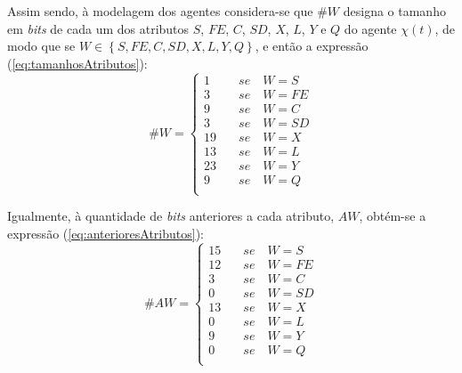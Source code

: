 Assim sendo, à modelagem dos agentes considera-se que $\# W$ designa o tamanho em \textit{bits} de cada um dos atributos $S$, $FE$, $C$, $SD$, $X$, $L$, $Y$ e $Q$ do agente $\chi(t)$, de modo que se $W \in \left\{S, FE, C, SD, X, L, Y, Q\right\}$, e então a expressão (\ref{eq:tamanhosAtributos}):
\begin{equation}
\# W=
 \begin{cases} 
 1 \quad &se \quad W=S  \\
 3 \quad &se \quad W=FE \\
 9 \quad &se \quad W=C  \\
 3 \quad &se \quad W=SD \\ 

 19 \quad &se \quad W=X \\ 
 13 \quad &se \quad W=L \\
 
 23 \quad &se \quad W=Y \\
 9  \quad &se \quad W=Q \\
 \end{cases}
 \label{eq:tamanhosAtributos}
\end{equation}

Igualmente, à quantidade de \textit{bits} anteriores a cada atributo, $AW$, obtém-se a expressão (\ref{eq:anterioresAtributos}):
\begin{equation}
\# AW=
 \begin{cases}
 15 \quad &se \quad W=S  \\
 12 \quad &se \quad W=FE \\
 3  \quad &se \quad W=C  \\
 0  \quad &se \quad W=SD \\
 
 13 \quad &se \quad W=X  \\
 0  \quad &se \quad W=L  \\
 
 9  \quad &se \quad W=Y  \\
 0  \quad &se \quad W=Q  \\
 \end{cases}
 \label{eq:anterioresAtributos}
\end{equation}

